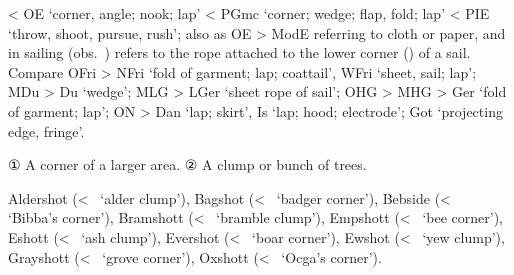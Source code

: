 \documentclass[12pt,letterpaper,oneside,article,draft]{memoir}
\begin{document}
\begin{Lemma}
\begin{Also}
\end{Also}
\end{Lemma}

\begin{Lemma}
\begin{Also}
\end{Also}
\begin{Etymology}
	< OE  ‘corner, angle; nook; lap’ < PGmc  ‘corner; wedge; flap, fold; lap’
		< PIE  ‘throw, shoot, pursue, rush’;
		also as OE  > ModE  referring to cloth or paper, and
		in sailing  (obs.\ ) refers to the rope attached to the lower corner ()
		of a sail.
	Compare
	OFri  > NFri  ‘fold of garment; lap; coattail’, WFri  ‘sheet, sail; lap’;
	MDu  > Du  ‘wedge’;
	MLG  > LGer  ‘sheet rope of sail’;
	OHG  > MHG  > Ger  ‘fold of garment; lap’;
	ON  > Dan  ‘lap; skirt’, Is  ‘lap; hood; electrode’;
	Got   ‘projecting edge, fringe’.
\end{Etymology}
\begin{Definitions}
	① A corner of a larger area.
	② A clump or bunch of trees.
\end{Definitions}
\begin{Examples}
	Aldershot (<~ ‘alder clump’), Bagshot (<~ ‘badger corner’), Bebside (<~ ‘Bibba’s corner’), Bramshott (<~ ‘bramble clump’), Empshott (<~ ‘bee corner’), Eshott (<~ ‘ash clump’), Evershot (<~ ‘boar corner’), Ewshot (<~ ‘yew clump’), Grayshott (<~ ‘grove corner’), Oxshott (<~ ‘Ocga’s corner’).
\end{Examples}
\end{Lemma}

\begin{Lemma}
\end{Lemma}
\end{document}
